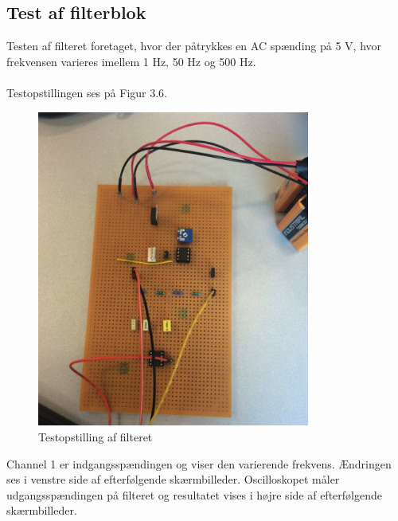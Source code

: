 \subsection{Test af filterblok}
Testen af filteret foretaget, hvor der påtrykkes en AC spænding på 5 V, hvor frekvensen varieres imellem 1 Hz, 50 Hz og 500 Hz. \\ \\

Testopstillingen ses på Figur 3.6.  

\begin{figure}[H]
	\centering
	\includegraphics[width=0.8\textwidth]{Figurer/Snip20151207_38}
	\caption{Testopstilling af filteret}
	\label{fig:Filter}
\end{figure}

Channel 1 er indgangsspændingen og viser den varierende frekvens. Ændringen ses i venstre side af efterfølgende skærmbilleder. 
Oscilloskopet måler udgangsspændingen på filteret og resultatet vises i højre side af efterfølgende skærmbilleder.

